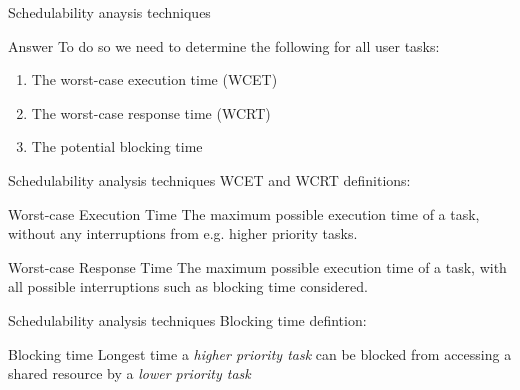 \begin{frame}{Schedulability anaysis techniques}
    \begin{block}{Answer}
        To do so we need to determine the following for all user tasks:
        \begin{enumerate}
            \item The worst-case execution time (WCET)
            \item The worst-case response time (WCRT)
            \item The potential blocking time
        \end{enumerate}
        
    \end{block}
\end{frame}

\begin{frame}{Schedulability analysis techniques}
    WCET and WCRT definitions:
    \vspace{1em}

    \begin{block}{Worst-case Execution Time}
        The maximum possible execution time of a task, without any
        interruptions from e.g. higher priority tasks.
    \end{block}

    \vspace{1em}

    \begin{block}{Worst-case Response Time}
        The maximum possible execution time of a task, with all
        possible interruptions such as blocking time considered.
    \end{block}
\end{frame}

\begin{frame}{Schedulability analysis techniques}
    Blocking time defintion:
    \begin{block}{Blocking time}
        Longest time a \emph{higher priority task} can be blocked from accessing a
        shared resource by a \emph{lower priority task}
    \end{block}
\end{frame}

